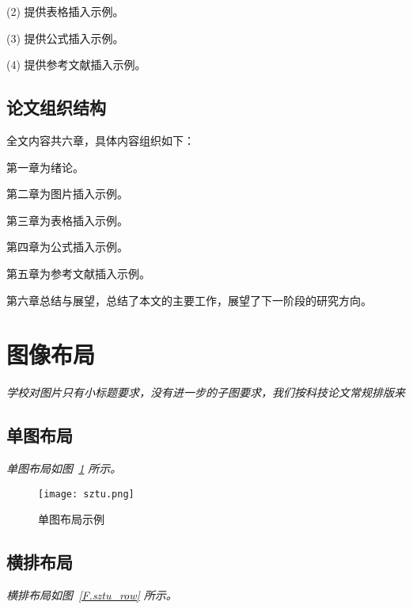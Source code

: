 (2) 提供表格插入示例。

(3) 提供公式插入示例。

(4) 提供参考文献插入示例。

\subsection{论文组织结构}

全文内容共六章，具体内容组织如下：

第一章为绪论。

第二章为图片插入示例。

第三章为表格插入示例。

第四章为公式插入示例。

第五章为参考文献插入示例。

第六章总结与展望，总结了本文的主要工作，展望了下一阶段的研究方向。


\section{图像布局}
\label{sec.figure}

\emph{学校对图片只有小标题要求，没有进一步的子图要求，我们按科技论文常规排版来}

\subsection{单图布局}

\lipsum

\emph{单图布局如图~\ref{F.sztu_single} 所示。}

\begin{figure}[hbt]
\centering
\texttt{[image: sztu.png]}
\caption{单图布局示例}
\label{F.sztu_single}
\end{figure}

\subsection{横排布局}

\emph{横排布局如图~\ref{F.sztu_row} 所示。}

